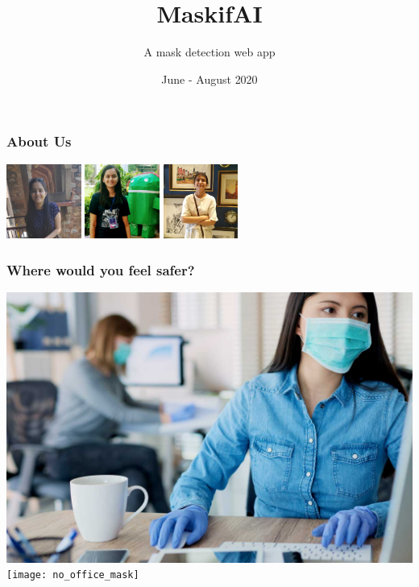 \documentclass[14pt]{beamer}
\title{MaskifAI}
\subtitle{A mask detection web app}
\author[WTEF Project]{}%
\date{June - August 2020}
\begin{document}
\begin{frame}
    \titlepage
\end{frame}


\begin{frame}
    \frametitle{About Us}
    \hfil\hfil\includegraphics[width=2.45cm]{SachitaMalhotra}\newline
    \null\hfil\hfil{}\newline
    \vfil
    \hfil\hfil\includegraphics[width=2.45cm]{ShruthiRao}\hfil\hfil
        \includegraphics[width=2.45cm]{SrishtiNegi}\newline
    \null\hfil\hfil{}
    \hfil\hfil{}
\end{frame}

\begin{frame}
    \frametitle{Where would you feel safer?}
    \centering
    \includegraphics[width=4.5 cm,height=3.5 cm]{office_mask}
    \texttt{[image: no\_office\_mask]}
\end{frame}
\end{document}
